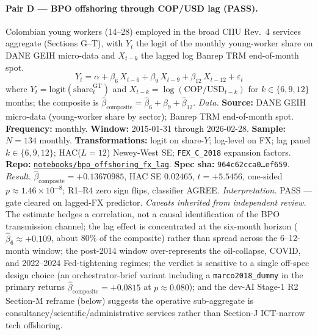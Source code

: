 \paragraph{Pair D --- BPO offshoring through COP/USD lag (PASS).}
Colombian young workers (14--28) employed in the broad CIIU Rev.~4 services aggregate (Sections G--T), with \(Y_t\) the logit of the monthly young-worker share on DANE GEIH micro-data and \(X_{t-k}\) the lagged log Banrep TRM end-of-month spot.
\[ Y_t = \alpha + \beta_6\, X_{t-6} + \beta_9\, X_{t-9} + \beta_{12}\, X_{t-12} + \varepsilon_t \]
where \(Y_t = \mathrm{logit}(\mathrm{share}_t^{\mathrm{GT}})\) and \(X_{t-k} = \log(\mathrm{COP}/\mathrm{USD}_{t-k})\) for \(k \in \{6, 9, 12\}\) months; the composite is \(\hat{\beta}_{\mathrm{composite}} = \hat{\beta}_6 + \hat{\beta}_9 + \hat{\beta}_{12}\).
\textit{Data.} \textbf{Source:} DANE GEIH micro-data (young-worker share by sector); Banrep TRM end-of-month spot. \textbf{Frequency:} monthly. \textbf{Window:} 2015-01-31 through 2026-02-28. \textbf{Sample:} \(N = 134\) monthly. \textbf{Transformations:} logit on share-\(Y\); log-level on FX; lag panel \(k \in \{6, 9, 12\}\); HAC(\(L=12\)) Newey-West SE; \texttt{FEX\_C\_2018} expansion factors. \textbf{Repo:} \href{https://github.com/JMSBPP/abrigo-analytics/tree/master/notebooks/bpo_offshoring_fx_lag}{\texttt{notebooks/bpo\_offshoring\_fx\_lag}}. \textbf{Spec sha:} \texttt{964c62cca0\ldots ef659}.
\textit{Result.} \(\hat{\beta}_{\mathrm{composite}} = +0.13670985\), HAC SE \(0.02465\), \(t = +5.5456\), one-sided \(p \approx 1.46 \times 10^{-8}\); R1--R4 zero sign flips, classifier AGREE.
\textit{Interpretation.} PASS --- gate cleared on lagged-FX predictor.
\textit{Caveats inherited from independent review.} The estimate hedges a correlation, not a causal identification of the BPO transmission channel; the lag effect is concentrated at the six-month horizon (\(\hat{\beta}_6 \approx +0.109\), about 80\% of the composite) rather than spread across the 6--12-month window; the post-2014 window over-represents the oil-collapse, COVID, and 2022--2024 Fed-tightening regimes; the verdict is sensitive to a single off-spec design choice (an orchestrator-brief variant including a \texttt{marco2018\_dummy} in the primary returns \(\hat{\beta}_{\mathrm{composite}} = +0.0815\) at \(p \approx 0.080\)); and the dev-AI Stage-1 R2 Section-M reframe (below) suggests the operative sub-aggregate is consultancy/scientific/administrative services rather than Section-J ICT-narrow tech offshoring.

